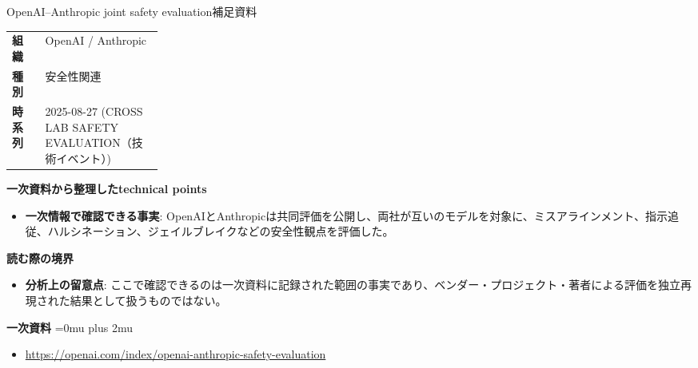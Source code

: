 \begin{technicalnote}{OpenAI–Anthropic joint safety evaluation}{補足資料}
\begingroup
\begin{tabularx}{\linewidth}{@{}>{\bfseries}p{0.22\linewidth}X@{}}
組織 & OpenAI / Anthropic \\
種別 & 安全性関連 \\
時系列 & 2025-08-27 (CROSS LAB SAFETY EVALUATION（技術イベント）) \\
\end{tabularx}
\smallskip
{\bfseries 一次資料から整理したtechnical points}
\begin{itemize}[leftmargin=1.5em,itemsep=0.35em]
\item \textbf{一次情報で確認できる事実}: OpenAIとAnthropicは共同評価を公開し、両社が互いのモデルを対象に、ミスアラインメント、指示追従、ハルシネーション、ジェイルブレイクなどの安全性観点を評価した。
\end{itemize}
\begin{minipage}{\linewidth}
{\bfseries 読む際の境界}
\begin{itemize}[leftmargin=1.5em,itemsep=0.35em]
\item \textbf{分析上の留意点}: ここで確認できるのは一次資料に記録された範囲の事実であり、ベンダー・プロジェクト・著者による評価を独立再現された結果として扱うものではない。
\end{itemize}
\begin{samepage}
{\bfseries 一次資料}
\begingroup\sloppy
\Urlmuskip=0mu plus 2mu\relax
\begin{itemize}[leftmargin=1.5em,itemsep=0.25em]
\item {\scriptsize\url{https://openai.com/index/openai-anthropic-safety-evaluation}}
\end{itemize}
\endgroup
\end{samepage}
\end{minipage}
\endgroup
\end{technicalnote}
\medskip
